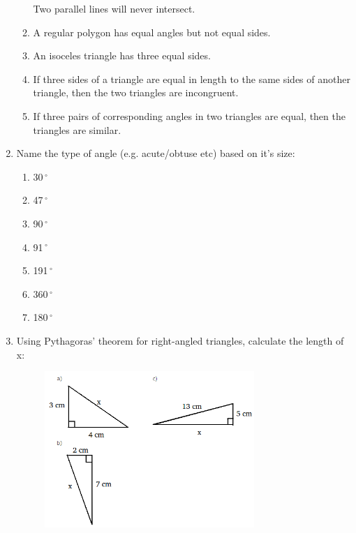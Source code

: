 \begin{enumerate}[noitemsep, label=\textbf{\arabic*}. ]
\begin{enumerate}[noitemsep, label=\textbf{\alph*}. ]
Two parallel lines will never intersect.\item A regular polygon has equal angles
but not equal sides.\item An isoceles triangle has three equal sides.\item If
three sides of a triangle are equal in length to the same sides of another
triangle, then the two triangles are incongruent.\item If three pairs of
corresponding angles in two triangles are equal, then the triangles are
similar.\end{enumerate}
\item Name the type of angle (e.g. acute/obtuse etc) based on it's size:
\begin{enumerate}[noitemsep, label=\textbf{\alph*}. ] 
\item  30\ensuremath{{\,}^{\circ}}\item  47\ensuremath{{\,}^{\circ}}\item 
90\ensuremath{{\,}^{\circ}}\item  91\ensuremath{{\,}^{\circ}}\item 
191\ensuremath{{\,}^{\circ}}\item  360\ensuremath{{\,}^{\circ}}\item 
180\ensuremath{{\,}^{\circ}}\end{enumerate}
\item Using Pythagoras' theorem for right-angled triangles, calculate the length
of x:
\setcounter{subfigure}{0}
\begin{figure}[H] %
\begin{center}
\label{m39368*id401236!!!underscore!!!media}\label{
m39368*id401236!!!underscore!!!printimage}\includegraphics[width=300px]{
col11306.imgs/m39368_MG10C13_070.png} %
\vspace{2pt}
\vspace{.1in}
\end{center}
\end{figure}       
\end{enumerate}

